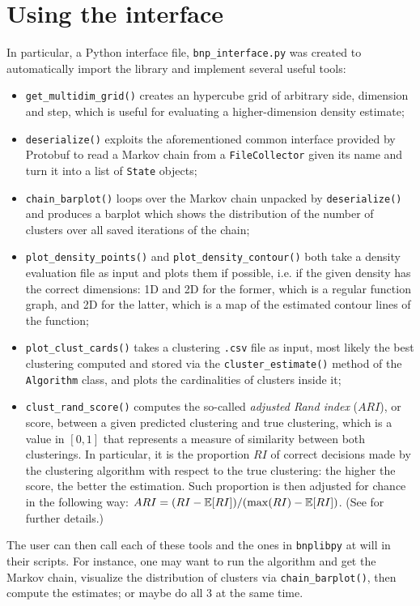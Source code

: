 \section{Using the interface}
In particular, a Python interface file, \verb|bnp_interface.py| was created to automatically import the library and implement several useful tools:
\begin{itemize}
	\item \verb|get_multidim_grid()| creates an hypercube grid of arbitrary side, dimension and step, which is useful for evaluating a higher-dimension density estimate;
	\item \verb|deserialize()| exploits the aforementioned common interface provided by Protobuf to read a Markov chain from a \verb|FileCollector| given its name and turn it into a list of \verb|State| objects;
	\item \verb|chain_barplot()| loops over the Markov chain unpacked by \verb|deserialize()| and produces a barplot which shows the distribution of the number of clusters over all saved iterations of the chain;
	\item \verb|plot_density_points()| and \verb|plot_density_contour()| both take a density evaluation file as input and plots them if possible, i.e. if the given density has the correct dimensions: 1D and 2D for the former, which is a regular function graph, and 2D for the latter, which is a map of the estimated contour lines of the function;
	\item \verb|plot_clust_cards()| takes a clustering \verb|.csv| file as input, most likely the best clustering computed and stored via the \verb|cluster_estimate()| method of the \verb|Algorithm| class, and plots the cardinalities of clusters inside it;
	\item \verb|clust_rand_score()| computes the so-called \emph{adjusted Rand index} ($ARI$), or score, between a given predicted clustering and true clustering, which is a value in $[0,1]$ that represents a measure of similarity between both clusterings.
	In particular, it is the proportion $RI$ of correct decisions made by the clustering algorithm with respect to the true clustering: the higher the score, the better the estimation.
	Such proportion is then adjusted for chance in the following way:
	$ARI = (RI - \mathbb E[RI]) / (\max(RI) - \mathbb E[RI])$.
	(See \cite{rand} for further details.)
\end{itemize}
The user can then call each of these tools and the ones in \verb|bnplibpy| at will in their scripts.
For instance, one may want to run the algorithm and get the Markov chain, visualize the distribution of clusters via \verb|chain_barplot()|, then compute the estimates; or maybe do all 3 at the same time.
